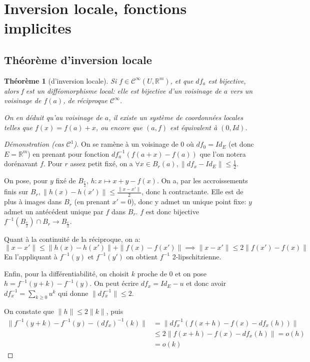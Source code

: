 \documentclass[a4paper]{article}
\newcommand{\cun}{\mathcal{C}^1}
\newcommand{\cinf}{\mathcal{C}^\infty}
\newcommand{\R}{\mathbb{R}}
\newtheorem{thm}{Théorème}
\theoremstyle{definition}
\begin{document}
\section{Inversion locale, fonctions implicites}

\subsection{Théorème d'inversion locale}

\setcounter{thm}{3}
\begin{thm}[d'inversion locale]
	Si $f\in\cinf(U,\R^m)$, et que $df_a$ est bijective, alors f est un difféomorphisme local: elle est bijective d'un voisinage de $a$ vers un voisinage de $f(a)$, de réciproque $\cinf$.

	On en déduit qu'au voisinage de $a$, il existe un système de coordonnées locales telles que $f(x)=f(a)+x$, ou encore que $(a,f)$ est équivalent à $(0,Id)$.
\end{thm}
\begin{proof}[Démonstration (cas $\cun$)]
	On se ramène à un voisinage de 0 où $df_0=Id_E$ (et donc $E=\R^m$) en prenant pour fonction $df_a^{-1}(f(a+x)-f(a))$ que l'on notera dorénavant $f$.
	Pour $r$ assez petit fixé, on a $\forall x\in B_r(a), \| df_x-Id_E \| \leq \frac{1}{2}$.

	On pose, pour $y$ fixé de $B_{\frac{r}{2}}$, $h:x\mapsto x+y-f(x)$.
	On a, par les accroissements finis sur $B_r, \| h(x) - h(x')\|\leq\frac{\| x-x' \|}{2}$, donc h contractante.
	Elle est de plus à images dans $B_r$ (en prenant $x'=0$), donc y admet un unique point fixe: $y$ admet un antécédent unique par $f$ dans $B_r$.
	$f$ est donc bijective $f^{-1}(B_\frac{r}{2}) \cap B_r \to B_{\frac{r}{2}}$.

	Quant à la continuité de la réciproque, on a:
	$$\|x-x'\| \leq \|h(x)-h(x')\| + \|f(x)-f(x')\| \implies \|x-x'\| \leq 2\|f(x')-f(x)\|$$
	En l'appliquant à $f^{-1}(y)$ et $f^{-1}(y')$ on obtient $f^{-1}$ 2-lipschitzienne.

	Enfin, pour la différentiabilité, on choisit $k$ proche de 0 et on pose $h=f^{-1}(y+k)-f^{-1}(y)$.
	On peut écrire $df_x=Id_E-u$ et donc avoir $df_x^{-1}=\sum_{k\geq0} u^k$ qui donne $\|df_x^{-1}\| \leq 2$.

	On constate que $\|h\|\leq 2\|k\|$, puis
	\begin{align*}\| f^{-1}(y+k)-f^{-1}(y)-(df_x)^{-1}(k) \| & = \|df_x^{-1}(f(x+h)-f(x)-df_x(h))\| \\ & \leq 2\| f(x+h)-f(x)-df_x(h) \| =o(h) \\ & = o(k)\end{align*}
\end{proof}
\end{document}
